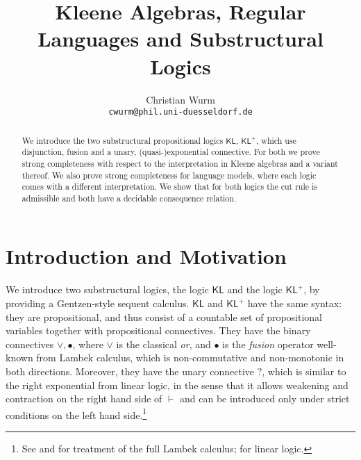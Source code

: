 \documentclass{eptcs}
\title{Kleene Algebras, Regular Languages and Substructural Logics}
\author{Christian Wurm \\
\texttt{cwurm@phil.uni-duesseldorf.de}}
\newcommand{\KL}{\mathsf{KL}}
\begin{document}
\maketitle
\begin{abstract}
We introduce the two substructural propositional logics $\KL$, $\KL^+$, 
which use disjunction, fusion and a unary, (quasi-)exponential 
connective. For both we prove strong completeness
with respect to the interpretation in Kleene 
algebras and a variant thereof.
We also prove strong completeness  for language models, where each
logic comes with a different interpretation.
We show that for both logics the cut rule is 
admissible and both have a decidable consequence relation.
\end{abstract}


\section{Introduction and Motivation}

We introduce two substructural logics, the logic $\KL$ and
the logic $\KL^+$, by providing a Gentzen-style sequent calculus.
$\KL$ and $\KL^+$ have the same syntax: they are propositional, 
and thus consist of a countable set of propositional variables together with
propositional connectives. They have the binary
connectives $\vee,\bullet$, where $\vee$ is the classical \textit{or},
and $\bullet$ is the \textit{fusion} operator well-known from 
Lambek calculus, which is non-commutative and non-monotonic in
both directions. Moreover, they have the unary connective $?$, which is similar
to the right exponential from linear logic, in the sense that it 
allows weakening and contraction on the right hand side of $\vdash$
and can be introduced only under strict conditions on the left hand 
side.\footnote{See \cite{galatos:residuated} and \cite{restall:introduction} 
for treatment of the full Lambek calculus; \cite{girard:linear} for 
linear logic.}
\end{document}
